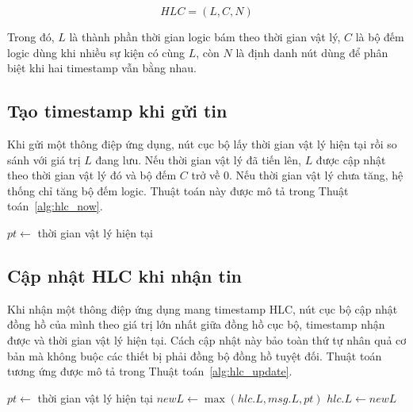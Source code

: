 \documentclass[../DoAn.tex]{subfiles}
\begin{document}
\begin{equation}
\label{eq:hlc_tuple}
HLC = (L, C, N)
\end{equation}

Trong đó, $L$ là thành phần thời gian logic bám theo thời gian vật lý, $C$ là bộ đếm logic dùng khi nhiều sự kiện có cùng $L$, còn $N$ là định danh nút dùng để phân biệt khi hai timestamp vẫn bằng nhau.

\subsection{Tạo timestamp khi gửi tin}

Khi gửi một thông điệp ứng dụng, nút cục bộ lấy thời gian vật lý hiện tại rồi so sánh với giá trị $L$ đang lưu. Nếu thời gian vật lý đã tiến lên, $L$ được cập nhật theo thời gian vật lý đó và bộ đếm $C$ trở về 0. Nếu thời gian vật lý chưa tăng, hệ thống chỉ tăng bộ đếm logic. Thuật toán này được mô tả trong Thuật toán~\ref{alg:hlc_now}.

\begin{algorithm}[htbp]
\SetAlgoLined
{}
\BlankLine
$pt \leftarrow$ thời gian vật lý hiện tại\;
\;
\caption{Sinh thời gian logic lai ($HLC\_Now$)}
\label{alg:hlc_now}
\end{algorithm}

\subsection{Cập nhật HLC khi nhận tin}

Khi nhận một thông điệp ứng dụng mang timestamp HLC, nút cục bộ cập nhật đồng hồ của mình theo giá trị lớn nhất giữa đồng hồ cục bộ, timestamp nhận được và thời gian vật lý hiện tại. Cách cập nhật này bảo toàn thứ tự nhân quả cơ bản mà không buộc các thiết bị phải đồng bộ đồng hồ tuyệt đối. Thuật toán tương ứng được mô tả trong Thuật toán~\ref{alg:hlc_update}.

\begin{algorithm}[htbp]
\SetAlgoLined
{}
\BlankLine
$pt \leftarrow$ thời gian vật lý hiện tại\;
$newL \leftarrow \max(hlc.L, msg.L, pt)$\;
$hlc.L \leftarrow newL$\;
\;
\caption{Cập nhật đồng hồ logic lai ($HLC\_Update$)}
\label{alg:hlc_update}
\end{algorithm}
\end{document}
